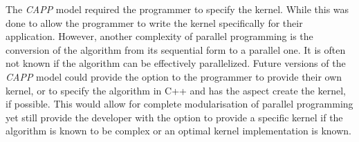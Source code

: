 \documentclass{sig-alternate-05-2015}
\begin{document}
The \textit{CAPP} model required the programmer to specify the kernel. While this
was done to allow the programmer to write the kernel specifically for their
application. However, another complexity of parallel programming is the
conversion of the algorithm from its sequential form to a parallel one. It is
often not known if the algorithm can be effectively parallelized. Future
versions of the \textit{CAPP} model could provide the option to the programmer to
provide their own kernel, or to specify the algorithm in C++ and has the aspect
create the kernel, if possible. This would allow for complete modularisation of
parallel programming yet still provide the developer with the option to provide
a specific kernel if the algorithm is known to be complex or an optimal kernel
implementation is known.

%

%
%
\end{document}
